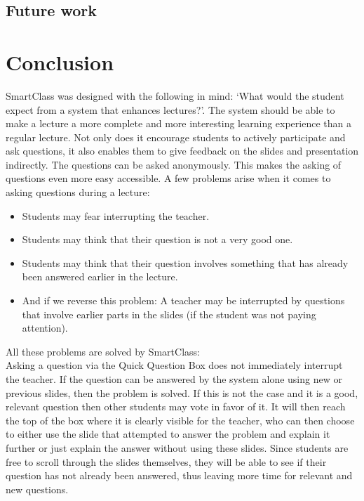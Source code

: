 \documentclass[11pt]{article}
\begin{document}
\subsection{Future work}

\section{Conclusion}
SmartClass was designed with the following in mind: `What would the student expect from a system that enhances lectures?'. The system should be able to make a lecture a more complete and more interesting learning experience than a regular lecture. Not only does it encourage students to actively participate and ask questions, it also enables them to give feedback on the slides and presentation indirectly. 
The questions can be asked anonymously. This makes the asking of questions even more easy accessible. A few problems arise when it comes to asking questions during a lecture:
\begin{itemize}
\item Students may fear interrupting the teacher.
\item Students may think that their question is not a very good one.
\item Students may think that their question involves something that has already been answered earlier in the lecture.
\item And if we reverse this problem: A teacher may be interrupted by questions that involve earlier parts in the slides (if the student was not paying attention).
\end{itemize}
All these problems are solved by SmartClass:\\
Asking a question via the Quick Question Box does not immediately interrupt the teacher. If the question can be answered by the system alone using new or previous slides, then the problem is solved. If this is not the case and it is a good, relevant question then other students may vote in favor of it. It will then reach the top of the box where it is clearly visible for the teacher, who can then choose to either use the slide that attempted to answer the problem and explain it further or just explain the answer without using these slides. Since students are free to scroll through the slides themselves, they will be able to see if their question has not already been answered, thus leaving more time for relevant and new questions.
\end{document}

